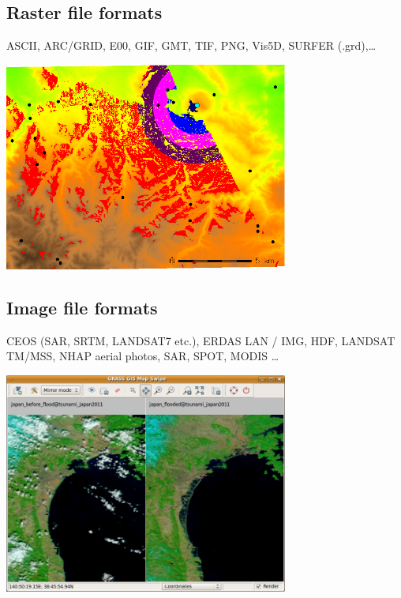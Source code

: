 \documentclass[notumble,a4paper,10pt,nofoldmark]{leaflet}
\newenvironment{myfig}[1][0pt plus 1.5ex minus .5ex]{\par\vspace*{#1}\begin{minipage}{\textwidth}\centering}{\end{minipage}}
\begin{document}
\subsection{Raster file formats}
ASCII, ARC/GRID, E00, GIF, GMT, TIF, PNG, Vis5D, SURFER (.grd),\dots
\begin{myfig}[1.ex]
\includegraphics[width=0.7\textwidth]{visibility}
\end{myfig}

\subsection{Image file formats}

CEOS (SAR, SRTM, LANDSAT7 etc.), ERDAS LAN / IMG, HDF, LANDSAT TM/MSS, NHAP aerial photos, SAR, SPOT, MODIS \dots
\begin{myfig}
\includegraphics[width=0.7\textwidth]{mapswipe}
\end{myfig}
\end{document}
